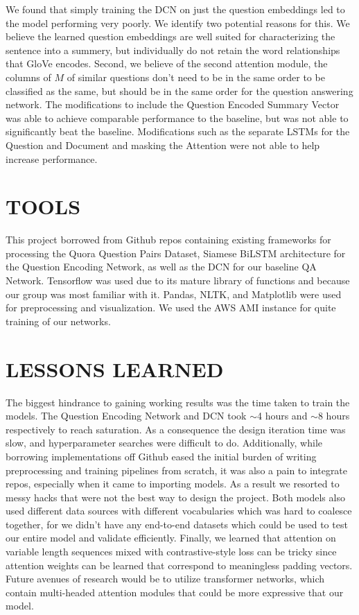 \documentclass[a4paper, 11pt]{article}
\begin{document}
We found that simply training the DCN on just the question embeddings led to the model performing very poorly.  We identify two potential reasons for this.  We believe the learned question embeddings are well suited for characterizing the sentence into a summery, but individually do not retain the word relationships that GloVe encodes.  Second, we believe of the second attention module, the columns of $M$ of similar questions don’t need to be in the same order to be classified as the same, but should be in the same order for the question answering network.  The modifications to include the Question Encoded Summary Vector was able to achieve comparable performance to the baseline, but was not able to significantly beat the baseline.  Modifications such as the separate LSTMs for the Question and Document and masking the Attention were not able to help increase performance.  

\section{TOOLS}
This project borrowed from Github repos containing existing frameworks for processing the Quora Question Pairs Dataset, Siamese BiLSTM architecture for the Question Encoding Network, as well as the DCN for our baseline QA Network. Tensorflow was used due to its mature library of functions and because our group was most familiar with it. Pandas, NLTK, and Matplotlib were used for preprocessing and visualization. We used the AWS AMI instance for quite training of our networks.

\section{LESSONS LEARNED}
The biggest hindrance to gaining working results was the time taken to train the models. The Question Encoding Network and DCN took $\sim$4 hours and $\sim$8 hours respectively to reach saturation. As a consequence the design iteration time was slow, and hyperparameter searches were difficult to do. \newline\newline 
Additionally, while borrowing implementations off Github eased the initial burden of writing preprocessing and training pipelines from scratch, it was also a pain to integrate repos, especially when it came to importing models. As a result we resorted to messy hacks that were not the best way to design the project. \newline\newline
Both models also used different data sources with different vocabularies which was hard to coalesce together, for we didn't have any end-to-end datasets which could be used to test our entire model and validate efficiently. \newline\newline
Finally, we learned that attention on variable length sequences mixed with contrastive-style loss can be tricky since attention weights can be learned that correspond to meaningless padding vectors. Future avenues of research would be to utilize transformer networks, which contain multi-headed attention modules that could be more expressive that our model. 
\end{document}
